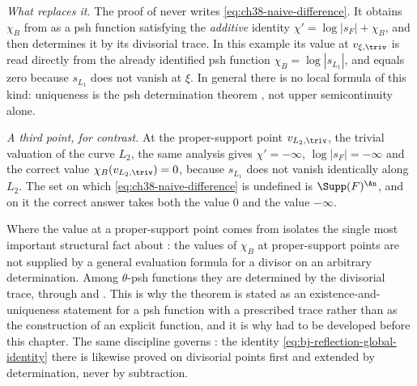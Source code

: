\begin{example}
\emph{What replaces it.}  The proof of
 never writes
\eqref{eq:ch38-naive-difference}.  It obtains
$\chi_B$ from  as a psh function
satisfying the \emph{additive} identity
$\chi'=\log|s_F|+\chi_B$, and then determines it by its divisorial
trace.  In this example its value at $v_{\xi,\triv}$ is read directly
from the already identified psh function
$\chi_B=\log|s_{L_1}|$, and equals zero because $s_{L_1}$ does not
vanish at $\xi$.  In general there is no local formula of this kind:
uniqueness is the psh determination theorem
, not upper semicontinuity alone.

\emph{A third point, for contrast.}  At the proper-support point
$v_{L_2,\triv}$, the trivial valuation of the curve $L_2$, the same
analysis gives $\chi'=-\infty$, $\log|s_F|=-\infty$ and the
correct value $\chi_B(v_{L_2,\triv})=0$, because $s_{L_1}$ does not
vanish identically along $L_2$.  The set on which
\eqref{eq:ch38-naive-difference} is undefined is
$\Supp(F)^{\An}$, and on it the correct answer takes both the value
$0$ and the value $-\infty$.
\end{example}

\begin{warning}{Where the value at a proper-support point comes from}
\label{warn:ch38-proper-support-value}
 isolates the single most
important structural fact about
: the values of $\chi_B$ at
proper-support points are not supplied by a general evaluation
formula for a divisor on an arbitrary determination.
Among $\theta$-psh functions they are determined by the divisorial trace,
through
 and
.  This is why the theorem is
stated as an existence-and-uniqueness statement for a psh function with a
prescribed trace rather than as the construction of an explicit function,
and it is why  had to be developed before
this chapter.  The same discipline governs
: the identity
\eqref{eq:bj-reflection-global-identity} there is likewise proved on
divisorial points first and extended by determination, never by
subtraction.
\end{warning}

